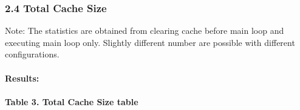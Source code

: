 \documentclass[11pt]{article}
\begin{document}
    \subsubsection{2.4 Total Cache Size}\label{total-cache-size}

Note: The statistics are obtained from clearing cache before main loop
and executing main loop only. Slightly different number are possible
with different configurations.

\paragraph{Results:}\label{results}

\paragraph{Table 3. Total Cache Size
table}\label{table-3.-total-cache-size-table}
\end{document}
